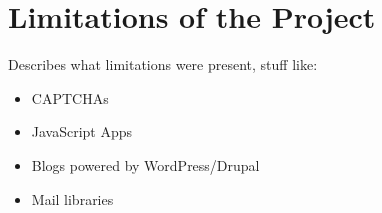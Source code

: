 \section[Limitations]{Limitations of the Project}
	Describes what limitations were present, stuff like:
	\begin{itemize}
		\item CAPTCHAs
		\item JavaScript Apps
		\item Blogs powered by WordPress/Drupal
		\item Mail libraries
	\end{itemize}